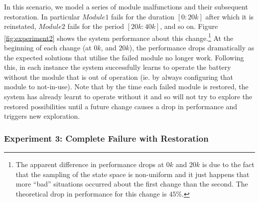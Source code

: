 In this scenario, we model a series of module malfunctions and their subsequent restoration. In particular $Module1$ fails for the duration $[0:20k]$ after which it is reinstated, $Module2$ fails for the period $[20k:40k]$, and so on. Figure \ref{fig:experiment2} shows the system performance about this change.\footnote{The apparent difference in performance drops at $0k$ and $20k$ is due to the fact that the sampling of the state space is non-uniform and it just happens that more ``bad'' situations occurred about the first change than the second. The theoretical drop in performance for this change is $45\%$.} At the beginning of each change (at $0k$, and $20k$), the performance drops dramatically as the expected solutions that utilise the failed module no longer work. Following this, in each instance the system successfully learns to operate the battery without the module that is out of operation (ie. by always configuring that module to not-in-use). Note that by the time each failed module is restored, the system has already learnt to operate without it and so will not try to explore the restored possibilities until a future change causes a drop in performance and triggers new exploration.


%

\subsubsection{Experiment 3: Complete Failure with Restoration}

